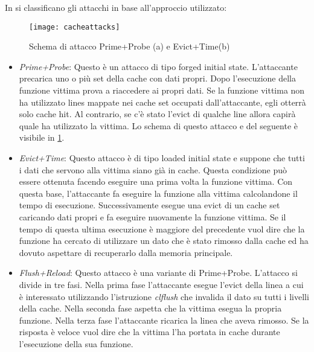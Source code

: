 			In \cite{lipp2016armageddon,ge2016survey} si classificano gli attacchi in base all'approccio utilizzato:
			
			\begin{figure}
				\begin{center}
					\texttt{[image: cacheattacks]}
					\caption{Schema di attacco Prime+Probe (a) e Evict+Time(b)}
					\label{fig:cacheattacks}
				\end{center}
			\end{figure}
			
			\begin{itemize}
				\item \emph{Prime+Probe}\cite{osvik2006cache}: Questo è un attacco di tipo forged initial state. L'attaccante precarica uno o più set della cache con dati propri. Dopo l'esecuzione della funzione vittima prova a riaccedere ai propri dati. Se la funzione vittima non ha utilizzato lines mappate nei cache set occupati dall'attaccante, egli otterrà solo cache hit. Al contrario, se c'è stato l'evict di qualche line allora capirà quale ha utilizzato la vittima. Lo schema di questo attacco e del seguente è visibile in \cref{fig:cacheattacks}.
				\item \emph{Evict+Time}\cite{osvik2006cache}: Questo attacco è di tipo loaded initial state e suppone che tutti i dati che servono alla vittima siano già in cache. Questa condizione può essere ottenuta facendo eseguire una prima volta la funzione vittima. Con questa base, l'attaccante fa eseguire la funzione alla vittima calcolandone il tempo di esecuzione. Successivamente esegue una evict di un cache set caricando dati propri e fa eseguire nuovamente la funzione vittima. Se il tempo di questa ultima esecuzione è maggiore del precedente vuol dire che la funzione ha cercato di utilizzare un dato che è stato rimosso dalla cache ed ha dovuto aspettare di recuperarlo dalla memoria principale.
				\item \emph{Flush+Reload}\cite{yarom2014flush+}: Questo attacco è una variante di Prime+Probe. L'attacco si divide in tre fasi. Nella prima fase l'attaccante esegue l'evict della linea a cui è interessato utilizzando l'istruzione \emph{clflush}\cite{intel64and} che invalida il dato su tutti i livelli della cache. Nella seconda fase aspetta che la vittima esegua la propria funzione. Nella terza fase l'attaccante ricarica la linea che aveva rimosso. Se la risposta è veloce vuol dire che la vittima l'ha portata in cache durante l'esecuzione della sua funzione.

\end{itemize}
